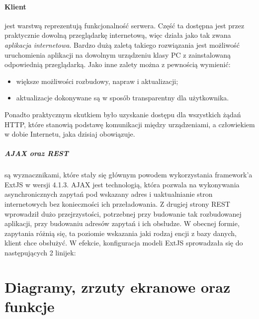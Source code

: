 		\paragraph{Klient} jest warstwą reprezentują funkcjonalność serwera. Część ta dostępna jest przez praktycznie
		dowolną przeglądarkę internetową, więc działa jako tak zwana \emph{aplikacja internetowa}. Bardzo
		dużą zaletą takiego rozwiązania jest możliwość uruchomienia aplikacji na dowolnym urządzeniu klasy PC z zainstalowaną
		odpowiednią przeglądarką. Jako inne zalety można z pewnością wymienić: 
		\begin{itemize}
			\item większe możliwości rozbudowy, napraw i aktualizacji;
			\item aktualizacje dokonywane są w sposób transparentny dla użytkownika.
		\end{itemize}
		Ponadto praktycznym skutkiem było uzyskanie dostępu dla wszystkich żądań HTTP, które stanowią podstawę
		komunikacji między urządzeniami, a człowiekiem w dobie Internetu, jaka dzisiaj obowiązuje.
		\subparagraph{AJAX oraz REST} są wyznacznikami, które stały się głównym powodem wykorzystania
		framework'a ExtJS w wersji 4.1.3. AJAX jest technologią, która pozwala na wykonywania asynchronicznych
		zapytań pod wskazany adres i uaktualnianie stron internetowych bez konieczności ich przeładowania. 
		Z drugiej strony REST wprowadził dużo przejrzystości, potrzebnej przy budowanie tak rozbudowanej aplikacji,
		przy budowaniu adresów zapytań i ich obsłudze. W obecnej formie, zapytania różnią się, ta poziomie
		wskazania jaki rodzaj encji z bazy danych, klient chce obsłużyć. W efekcie, konfiguracja modeli ExtJS
		sprowadzała się do następujących 2 linijek:
\section{Diagramy, zrzuty ekranowe oraz funkcje}
